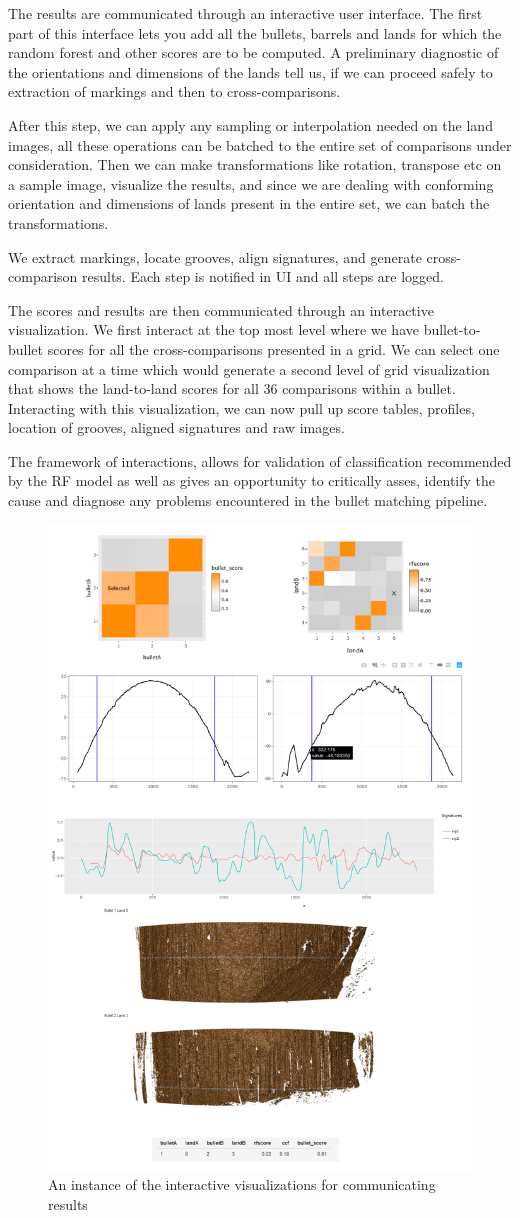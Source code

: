 \documentclass[]{book}
\begin{document}
The results are communicated through an interactive user interface. The first part of this interface lets you add all the bullets, barrels and lands for which the random forest and other scores are to be computed. A preliminary diagnostic of the orientations and dimensions of the lands tell us, if we can proceed safely to extraction of markings and then to cross-comparisons.

After this step, we can apply any sampling or interpolation needed on the land images, all these operations can be batched to the entire set of comparisons under consideration. Then we can make transformations like rotation, transpose etc on a sample image, visualize the results, and since we are dealing with conforming orientation and dimensions of lands present in the entire set, we can batch the transformations.

We extract markings, locate grooves, align signatures, and generate cross-comparison results. Each step is notified in UI and all steps are logged.

The scores and results are then communicated through an interactive visualization. We first interact at the top most level where we have bullet-to-bullet scores for all the cross-comparisons presented in a grid. We can select one comparison at a time which would generate a second level of grid visualization that shows the land-to-land scores for all 36 comparisons within a bullet. Interacting with this visualization, we can now pull up score tables, profiles, location of grooves, aligned signatures and raw images.

The framework of interactions, allows for validation of classification recommended by the RF model as well as gives an opportunity to critically asses, identify the cause and diagnose any problems encountered in the bullet matching pipeline.

\begin{figure}

{\centering \includegraphics[width=0.5\linewidth]{images/bullets/gan-app2_consolidated} 

}

\caption{An instance of the interactive visualizations for communicating results}\label{fig:unnamed-chunk-24}
\end{figure}
\end{document}
